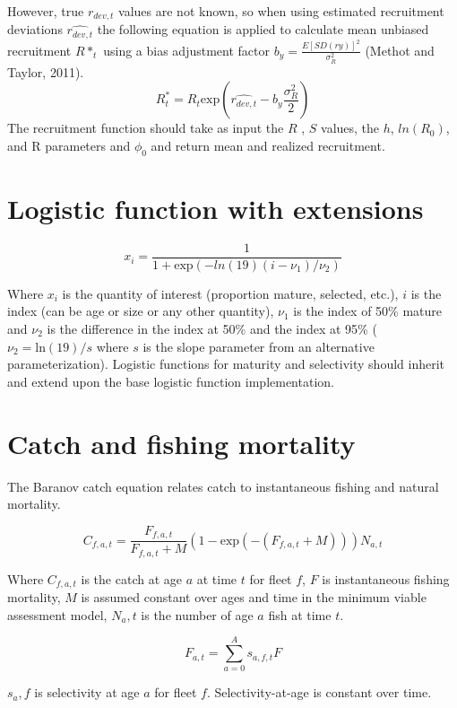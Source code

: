 \documentclass[
]{book}
\begin{document}
However, true \(r_{dev,t}\) values are not known, so when using estimated recruitment deviations \(\hat{r_{dev,t}}\) the following equation is applied to calculate mean unbiased recruitment \(R*_t\) using a bias adjustment factor \(b_y=\frac{E[SD(ry)]^2}{\sigma_R^2}\) (Methot and Taylor, 2011).
\[R^*_t=R_t\mathrm{exp}(\hat{r_{dev,t}}-b_y\frac{\sigma_R^2}{2})\]
The recruitment function should take as input the \(R\) , \(S\) values, the \(h\), \(ln(R_0)\), and R parameters and \(\phi_0\) and return mean and realized recruitment.

\hypertarget{logistic-function-with-extensions}{%
\section{Logistic function with extensions}\label{logistic-function-with-extensions}}

\[x_i=\frac{1}{1+\mathrm{exp}(-ln(19)(i-\nu_1)/\nu_2)}\]

Where \(x_i\) is the quantity of interest (proportion mature, selected, etc.), \(i\) is the index (can be age or size or any other quantity),
\(\nu_1\) is the index of 50\% mature and \(\nu_2\) is the difference in the index at 50\% and the index at 95\% (\(\nu_2 = \mathrm{ln}(19)/s\) where
\(s\) is the slope parameter from an alternative parameterization). Logistic functions for maturity and selectivity should inherit and extend
upon the base logistic function implementation.

\hypertarget{catch-and-fishing-mortality}{%
\section{Catch and fishing mortality}\label{catch-and-fishing-mortality}}

The Baranov catch equation relates catch to instantaneous fishing and natural mortality.

\[ C_{f,a,t}=\frac{F_{f,a,t}}{F_{f,a,t}+M}(1-\mathrm{exp}(-(F_{f,a,t}+M)))N_{a,t}\]

Where \(C_{f,a,t}\) is the catch at age \(a\) at time \(t\) for fleet \(f\), \(F\) is instantaneous fishing mortality,
\(M\) is assumed constant over ages and time in the minimum viable assessment model, \(N_a,t\) is the number of
age \(a\) fish at time \(t\).

\[F_{a,t}=\sum_{a=0}^A s_{a,f,t}F\]

\(s_a,f\) is selectivity at age \(a\) for fleet \(f\). Selectivity-at-age is constant over time.
\end{document}

